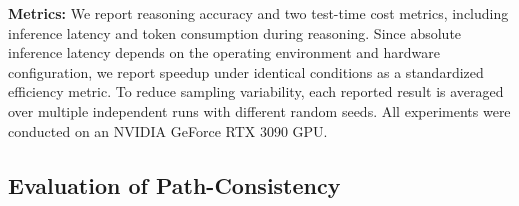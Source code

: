 \textbf{Metrics:} We report reasoning accuracy and two test-time cost metrics, including inference latency and token consumption during reasoning. Since absolute inference latency depends on the operating environment and hardware configuration, we report speedup under identical conditions as a standardized efficiency metric. To reduce sampling variability, each reported result is averaged over multiple independent runs with different random seeds. All experiments were conducted on an NVIDIA GeForce RTX 3090 GPU.


\subsection{Evaluation of Path-Consistency}
